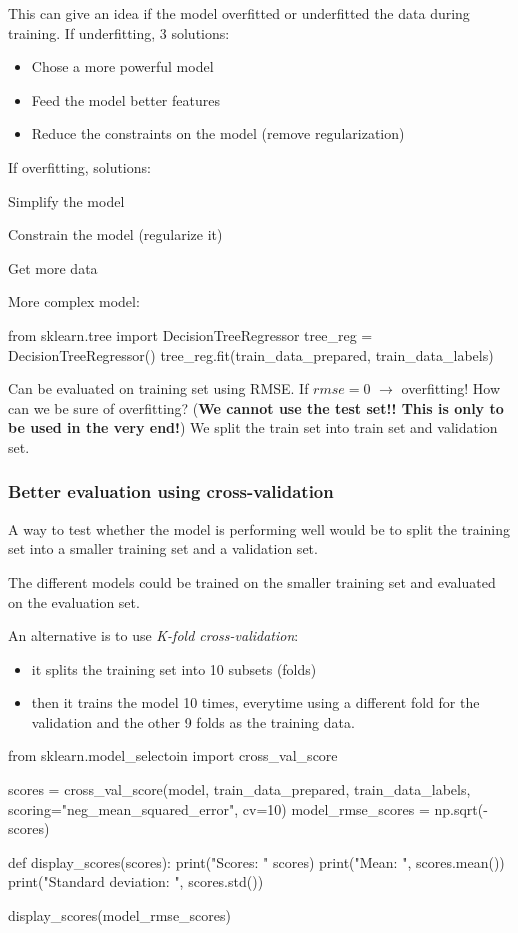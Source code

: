 \documentclass{article}
\begin{document}
    This can give an idea if the model overfitted or underfitted the data during training.
    If underfitting, 3 solutions:
    \begin{itemize}
        \item Chose a more powerful model
        \item Feed the model better features
        \item Reduce the constraints on the model (remove regularization)
    \end{itemize}
    If overfitting, solutions:
    \begin{item}
        \item Simplify the model
        \item Constrain the model (regularize it)
        \item Get more data
    \end{item}

    More complex model:
    \begin{python}
        from sklearn.tree import DecisionTreeRegressor
        tree_reg = DecisionTreeRegressor()
        tree_reg.fit(train_data_prepared, train_data_labels)
    \end{python}
    Can be evaluated on training set using RMSE.
    If $rmse=0$ $\rightarrow$ overfitting!
    How can we be sure of overfitting? (\textbf{We cannot use the test set!! This is only to be used in the very end!})
    We split the train set into train set and validation set.

\subsubsection*{Better evaluation using cross-validation}
    A way to test whether the model is performing well would be to split the training set into a smaller training set and a validation set.

    The different models could be trained on the smaller training set and evaluated on the evaluation set.

    An alternative is to use \emph{K-fold cross-validation}:\\
    \begin{itemize}
        \item it splits the training set into 10 subsets (folds)
        \item then it trains the model 10 times, everytime using a different fold for the validation and the other 9 folds as the training data.
    \end{itemize}
    \begin{python}
        from sklearn.model_selectoin import cross_val_score

        scores = cross_val_score(model, train_data_prepared, train_data_labels,
                    scoring="neg_mean_squared_error", cv=10)
        model_rmse_scores = np.sqrt(-scores)

        def display_scores(scores):
            print("Scores: " scores)
            print("Mean: ", scores.mean())
            print("Standard deviation: ", scores.std())

        display_scores(model_rmse_scores)
    \end{python}
\end{document}
